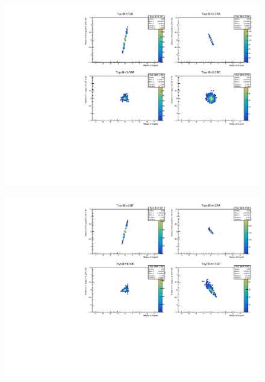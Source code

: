 \begin{figure}[H]
\includegraphics[width=\textwidth]{plots/diffx/instab/linearfx/instabilities_mjj_QCD_Mgraph_Signal_Sh2211_BSDATASTATS_linearfx_newbinning_sherpaasimov_bin3.pdf}
\end{figure}
\begin{figure}[H]
\includegraphics[width=\textwidth]{plots/diffx/instab/linearfx/instabilities_mjj_QCD_Mgraph_Signal_Sh2211_BSDATASTATS_linearfx_newbinning_sherpaasimov_bin4.pdf}
\end{figure}

